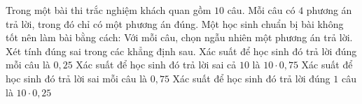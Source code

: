 \begin{ex}%
 Trong một bài thi trắc nghiệm khách quan gồm $10$ câu. Mỗi câu có $4$ phương án trả lời, trong đó chỉ có một phương án đúng. Một học sinh chuẩn bị bài không tốt nên làm bài bằng cách: Với mỗi câu,  chọn ngẫu nhiên một phương án trả lời. Xét tính đúng sai trong các khẳng định sau.
 \choiceTF 
  {\True Xác suất để học sinh đó trả lời đúng  mỗi câu là $0{,}25$}
  {Xác suất để học sinh đó trả lời sai cả $10$ là  $10 \cdot 0{,}75$}
  {\True Xác suất  để học sinh đó trả lời sai mỗi câu là $0{,}75$}
  {\True Xác suất để học sinh đó trả lời đúng $1$ câu là $10 \cdot 0{,}25$} 
\end{ex}

